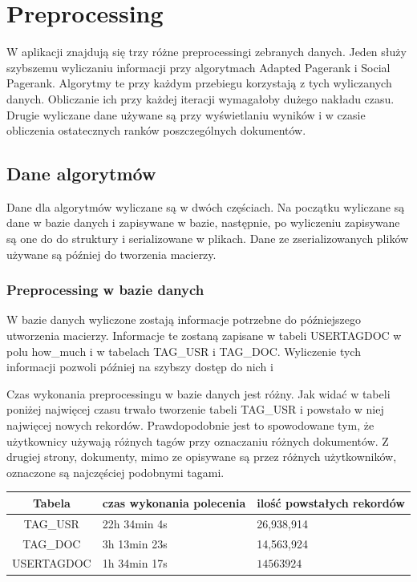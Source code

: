 \documentclass[11pt,a4paper]{report}
\begin{document}
\tableofcontents
\listoflistings
\chapter{Preprocessing}

W aplikacji znajdują się trzy różne preprocessingi zebranych danych. Jeden służy szybszemu wyliczaniu informacji przy algorytmach Adapted Pagerank i Social Pagerank. Algorytmy te przy każdym przebiegu korzystają z tych wyliczanych danych. Obliczanie ich przy każdej iteracji wymagałoby dużego nakładu czasu. Drugie wyliczane dane używane są przy wyświetlaniu wyników i w czasie obliczenia ostatecznych ranków  poszczególnych dokumentów.

\section{Dane algorytmów}

Dane dla algorytmów wyliczane są w dwóch częściach. Na początku wyliczane są dane w bazie danych i zapisywane w bazie, następnie, po wyliczeniu zapisywane są one do do struktury i serializowane w plikach. Dane ze zserializowanych plików używane są później do tworzenia macierzy.

\subsection{Preprocessing w bazie danych}

W bazie danych wyliczone zostają informacje potrzebne do późniejszego utworzenia macierzy. Informacje te zostaną zapisane w tabeli USERTAGDOC w polu how\_much i w tabelach TAG\_USR i TAG\_DOC. Wyliczenie tych informacji pozwoli później na szybszy dostęp do nich i 

Czas wykonania preprocessingu w bazie danych jest różny. Jak widać w tabeli poniżej najwięcej czasu trwało tworzenie tabeli TAG\_USR i powstało w niej najwięcej nowych rekordów. Prawdopodobnie jest to spowodowane tym, że użytkownicy używają różnych tagów przy oznaczaniu różnych dokumentów. Z drugiej strony, dokumenty, mimo ze opisywane są przez różnych użytkowników, oznaczone są najczęściej podobnymi tagami.

\begin{center}
    \begin{tabular}{ | c | p{3cm}| p{3cm} | }
    \hline
    Tabela & czas wykonania polecenia & ilość powstałych rekordów  \\ 
    \hline
    TAG\_USR & 22h 34min 4s & 26,938,914   \\ 
    \hline
    TAG\_DOC & 3h 13min 23s  &  14,563,924\\ 
    \hline
    USERTAGDOC & 1h 34min 17s  & $14563924$  \\ 
    \hline
    \end{tabular}
\end{center}
\end{document}
